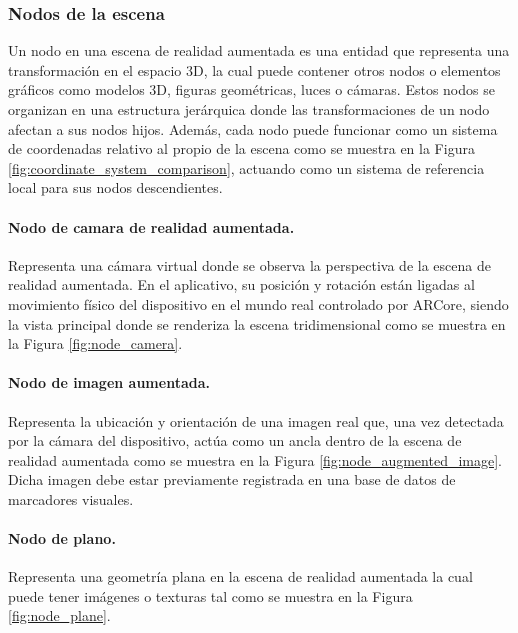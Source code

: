             

        \subsubsection{Nodos de la escena}

            Un nodo en una escena de realidad aumentada es una entidad que representa una transformación en el espacio 3D, la cual puede contener otros nodos o elementos gráficos como modelos 3D, figuras geométricas, luces o cámaras. Estos nodos se organizan en una estructura jerárquica donde las transformaciones de un nodo afectan a sus nodos hijos. Además, cada nodo puede funcionar como un sistema de coordenadas relativo al propio de la escena como se muestra en la Figura \ref{fig:coordinate_system_comparison}, actuando como un sistema de referencia local para sus nodos descendientes.

            

            \paragraph{Nodo de camara de realidad aumentada.}Representa una cámara virtual donde se observa la perspectiva de la escena de realidad aumentada. En el aplicativo, su posición y rotación están ligadas al movimiento físico del dispositivo en el mundo real controlado por ARCore, siendo la vista principal donde se renderiza la escena tridimensional como se muestra en la Figura \ref{fig:node_camera}.

            

            \paragraph{Nodo de imagen aumentada.}Representa la ubicación y orientación de una imagen real que, una vez detectada por la cámara del dispositivo, actúa como un ancla dentro de la escena de realidad aumentada como se muestra en la Figura \ref{fig:node_augmented_image}. Dicha imagen debe estar previamente registrada en una base de datos de marcadores visuales.

            

            \paragraph{Nodo de plano.}Representa una geometría plana en la escena de realidad aumentada la cual puede tener imágenes o texturas tal como se muestra en la Figura \ref{fig:node_plane}.

